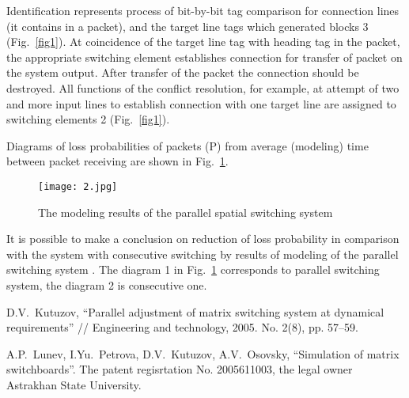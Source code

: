 \documentclass[10pt]{article}
\begin{document}
Identification represents process of bit-by-bit tag comparison for
connection lines (it contains in a packet), and the target line tags
which generated blocks 3 (Fig.~\ref{fig1}). At coincidence of the
target line tag with heading tag in the packet, the appropriate
switching element establishes connection for transfer of packet on
the system output. After transfer of the packet the connection
should be destroyed. All functions of the conflict resolution, for
example, at attempt of two and more input lines to establish
connection with one target line are assigned to switching elements 2
(Fig.~\ref{fig1}).

Diagrams of loss probabilities of packets (P) from average
(modeling) time between packet receiving are shown in
Fig.~\ref{fig2}.

\begin{figure}[htbp]
\centerline{\texttt{[image: 2.jpg]}}\caption{The modeling
results of the parallel spatial switching system} \label{fig2}
\end{figure}

It is possible to make a conclusion on reduction of loss probability
in comparison with the system with consecutive switching by results
of modeling of the parallel switching system \cite{Lunev}. The
diagram 1 in Fig.~\ref{fig2} corresponds to parallel switching
system, the diagram 2 is consecutive one.


\begin{thebibliography}{9}
 D.V.~Kutuzov, ``Parallel adjustment of matrix
switching system at dynamical requirements'' // Engineering and
technology, 2005. No. 2(8), pp. 57--59.

 A.P.~Lunev, I.Yu.~Petrova, D.V.~Kutuzov,
A.V.~Osovsky, ``Simulation of matrix switchboards''. The patent
regisrtation No. 2005611003, the legal owner Astrakhan State
University.

\end{thebibliography}
\end{document}
